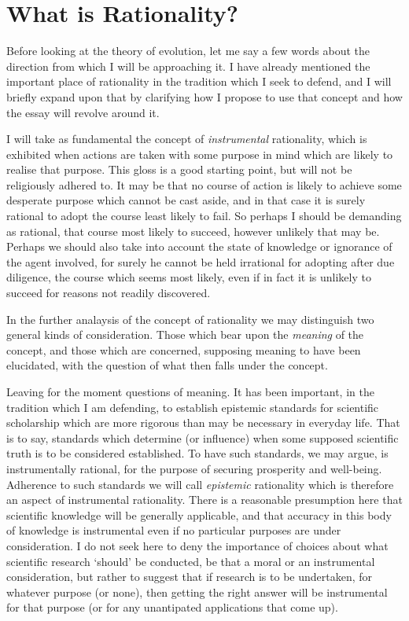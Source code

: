 \documentclass[10pt,titlepage]{article}
\begin{document}
\section{What is Rationality?}

Before looking at the theory of evolution, let me say a few words about the direction from which I will be approaching it.
I have already mentioned the important place of rationality in the tradition which I seek to defend, and I will briefly expand upon that by clarifying how I propose to use that concept and how the essay will revolve around it.

I will take as fundamental the concept of \emph{instrumental} rationality, which is exhibited when actions are taken with some purpose in mind which are likely to realise that purpose.
This gloss is a good starting point, but will not be religiously adhered to.
It may be that no course of action is likely to achieve some desperate purpose which cannot be cast aside, and in that case it is surely rational to adopt the course least likely to fail.
So perhaps I should be demanding as rational, that course most likely to succeed, however unlikely that may be.
Perhaps we should also take into account the state of knowledge or ignorance of the agent involved, for surely he cannot be held irrational for adopting after due diligence, the course which seems most likely, even if in fact it is unlikely to succeed for reasons not readily discovered.

In the further analaysis of the concept of rationality we may distinguish two general kinds of consideration.
Those which bear upon the \emph{meaning} of the concept, and those which are concerned, supposing meaning to have been elucidated, with the question of what then falls under the concept.

Leaving for the moment questions of meaning.
It has been important, in the tradition which I am defending, to establish epistemic standards for scientific scholarship which are more rigorous than may be necessary in everyday life.
That is to say, standards which determine (or influence) when some supposed scientific truth is to be considered established.
To have such standards, we may argue, is instrumentally rational, for the purpose of securing prosperity and well-being.
Adherence to such standards we will call \emph{epistemic} rationality which is therefore an aspect of instrumental rationality.
There is a reasonable presumption here that scientific knowledge will be generally applicable, and that accuracy in this body of knowledge is instrumental even if no particular purposes are under consideration.
I do not seek here to deny the importance of choices about what scientific research `should' be conducted, be that a moral or an instrumental consideration, but rather to suggest that if research is to be undertaken, for whatever purpose (or none), then getting the right answer will be instrumental for that purpose (or for any unantipated applications that come up).
\end{document}
